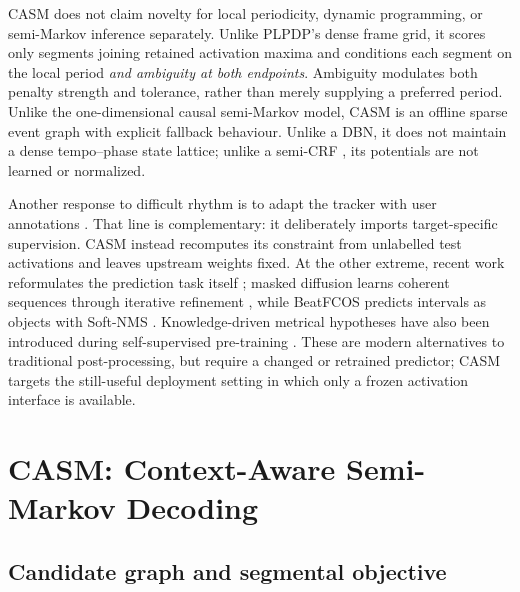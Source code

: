 \documentclass{article}
\begin{document}
CASM does not claim novelty for local periodicity, dynamic programming, or
semi-Markov inference separately. Unlike PLPDP's dense frame grid, it scores
only segments joining retained activation maxima and conditions each segment on
the local period \emph{and ambiguity at both endpoints}. Ambiguity modulates
both penalty strength and tolerance, rather than merely supplying a preferred
period. Unlike the one-dimensional causal semi-Markov model, CASM is an
offline sparse event graph with explicit fallback behaviour. Unlike a DBN, it
does not maintain a dense tempo--phase state lattice; unlike a semi-CRF
\cite{sarawagi2004semimarkov}, its potentials are not learned or normalized.

Another response to difficult rhythm is to adapt the tracker with user
annotations \cite{pinto2021userdriven,maia2022adapting,pinto2023bridging,
maia2024selective,pinto2026challenging}. That line is complementary: it deliberately imports
target-specific supervision. CASM instead recomputes its constraint from
unlabelled test activations and leaves upstream weights fixed. At the other
extreme, recent work reformulates the prediction task itself
\cite{bolt2026reformulated}; masked diffusion learns coherent sequences through
iterative refinement \cite{foscarin2026masked}, while BeatFCOS predicts
intervals as objects with Soft-NMS \cite{ahn2025beatfcos}. Knowledge-driven
metrical hypotheses have also been introduced during self-supervised
pre-training \cite{gagnere2025multiple}. These are modern alternatives to
traditional post-processing, but require a changed or retrained predictor;
CASM targets the still-useful deployment setting in which only a frozen
activation interface is available.

\section{CASM: Context-Aware Semi-Markov Decoding}
\label{sec:method}

\subsection{Candidate graph and segmental objective}
\end{document}
